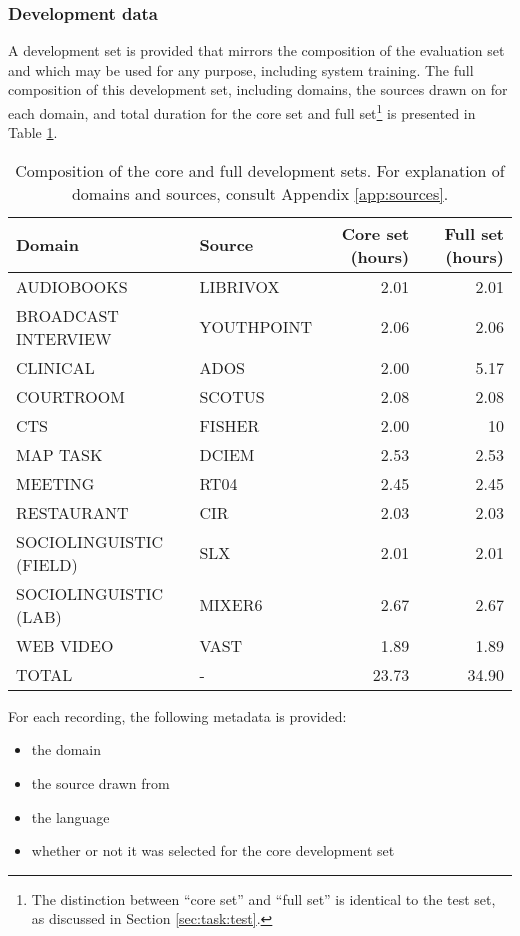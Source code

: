 \documentclass{article}
\begin{document}
\subsubsection{Development data}
A development set is provided that mirrors the composition of the evaluation set and which may be used for any purpose, including system training. The full composition of this development set, including domains, the sources drawn on for each domain, and total duration for the core set and full set\footnote{The distinction between ``core set'' and ``full set'' is identical to the test set, as discussed in Section \ref{sec:task:test}.} is presented in Table \ref{tab:single_chan_dev_set}.
\begin{table}[H]
    \centering
        \begin{tabular}{llrr}
        \hline
         {\bf Domain}       & {\bf Source} &  {\bf Core set (hours)} &   {\bf Full set (hours)} \\
        \hline
         AUDIOBOOKS          & LIBRIVOX   &  2.01 &       2.01 \\
         BROADCAST INTERVIEW & YOUTHPOINT &  2.06 &       2.06 \\
         CLINICAL            & ADOS       &  2.00 &       5.17 \\
         COURTROOM           & SCOTUS     &  2.08 &       2.08 \\
         CTS                 & FISHER     &  2.00   &  10 \\
         MAP TASK             & DCIEM      &  2.53 &      2.53 \\
         MEETING             & RT04       &  2.45 &       2.45 \\
        RESTAURANT                 & CIR        &  2.03 &       2.03 \\
         SOCIOLINGUISTIC (FIELD)         & SLX        &  2.01 &       2.01 \\
         SOCIOLINGUISTIC (LAB)           & MIXER6     &  2.67 &       2.67 \\
         WEB VIDEO            & VAST       &  1.89 &       1.89 \\
         \hline
         TOTAL               & -          & 23.73   &      34.90 \\
        \hline
        \end{tabular}
    \caption{Composition of the core and full development sets. For explanation of domains and sources, consult Appendix \ref{app:sources}.}
    \label{tab:single_chan_dev_set}
\end{table}
For each recording, the following metadata is provided:
    \begin{itemize}
        \item the domain
        \item the source drawn from
        \item the language
        \item whether or not it was selected for the core development set
    \end{itemize}
\end{document}
